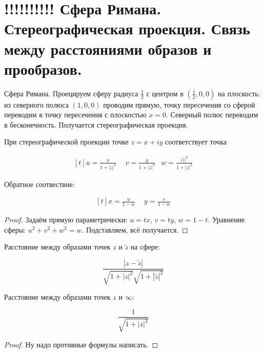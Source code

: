 \section{!!!!!!!!!! Сфера Римана. Стереографическая проекция. Связь между расстояниями образов и прообразов.}

\begin{definition}
    Сфера Римана.
    Проецируем сферу радиуса $\frac12$ с центром в $(\frac12, 0, 0)$
    на плоскость: из северного полюса $(1, 0, 0)$
    проводим прямую, точку пересечения со сферой переводим
    в точку пересечения с плоскостью $x = 0$. Северный полюс
    переводим в бесконечность.
    Получается стереографическая проекция.
\end{definition}

\begin{theorem}
    При стереографической проекции точке $z = x + iy$
    соответствует точка

    \[
        \begin{aligned}[t]
            u = \frac{x}{1+|z|^2} & \ \ %
            v = \frac{y}{1+|z|^2} &
            w = \frac{|z|^2}{1+|z|^2}
        \end{aligned}
    \]

    Обратное соотвествие:

    \[
        \begin{aligned}[t]
            x = \frac{u}{1-w} & \ \ %
            y = \frac{v}{1-w}
        \end{aligned}
    \]
\end{theorem}

\begin{proof}
    Задаём прямую параметрически: $u = tx$, $v = ty$, $w = 1 - t$.
    Уравнение сферы: $u^2+v^2+w^2 = w$.
    Подставляем, всё получается.
\end{proof}

\begin{consequence}
    Расстояние между образами точек $z$ и $\widetilde z$
    на сфере:

    \[
        \frac{|z-\widetilde z|}{\sqrt{1+|z|^2}\sqrt{1+|\widetilde z|^2}}
    \]

    Расстояние между образами точек $z$ и $\infty$:

    \[
        \frac{1}{\sqrt{1+|z|^2}}
    \]
\end{consequence}

\begin{proof}
    Ну надо противные формулы написать.
\end{proof}

